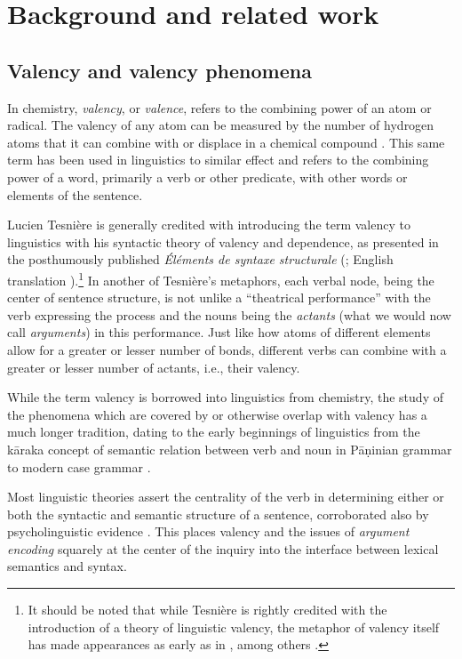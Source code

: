 \section{Background and related work}

\subsection{Valency and valency phenomena}


In chemistry, \textit{valency}, or \textit{valence}, refers to the combining power of an atom or radical. The valency of any atom can be measured by the number of hydrogen atoms that it can combine with or displace in a chemical compound \citep{law2020a}. This same term has been used in linguistics to similar effect and refers to the combining power of a word, primarily a verb or other predicate, with other words or elements of the sentence. 

Lucien Tesnière is generally credited with introducing the term valency to linguistics with his syntactic theory of valency and dependence, as presented in the posthumously published \textit{Éléments de syntaxe structurale} (\cite*{tesniere1959}; English translation \cite*{tesniere2015}).\footnote{
    It should be noted that while Tesnière is rightly credited with the introduction of a theory of linguistic valency, the metaphor of valency itself has made appearances as early as in \citet{peirce1897}, among others \citep{przepiorkowski2018}.
}
In another of Tesnière's metaphors, each verbal node, being the center of sentence structure, is not unlike a ``theatrical performance'' with the verb expressing the process and the nouns being the \textit{actants} (what we would now call \textit{arguments}) in this performance. Just like how atoms of different elements allow for a greater or lesser number of bonds, different verbs can combine with a greater or lesser number of actants, i.e., their valency.

While the term valency is borrowed into linguistics from chemistry, the study of the phenomena which are covered by or otherwise overlap with valency has a much longer tradition, dating to the early beginnings of linguistics from the kāraka concept of semantic relation between verb and noun \citep{ganeri2011a} in Pāṇinian grammar to modern case grammar \citep{fillmore1968}. 

Most linguistic theories assert the centrality of the verb in determining either or both the syntactic and semantic structure of a sentence, corroborated also by psycholinguistic evidence \citep{healy1970}. This places valency and the issues of \textit{argument encoding} squarely at the center of the inquiry into the interface between lexical semantics and syntax.

